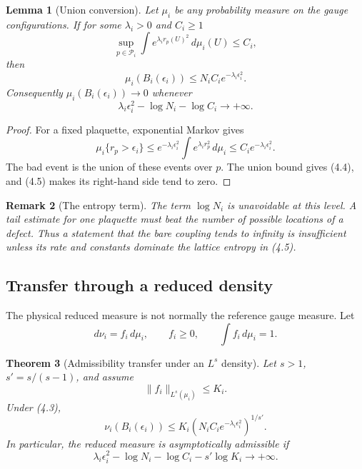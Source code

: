 \documentclass[11pt]{article}
\newtheorem{theorem}{Theorem}[section]
\newtheorem{lemma}[theorem]{Lemma}
\newtheorem{remark}[theorem]{Remark}
\begin{document}
\begin{lemma}[Union conversion]
\label{lem:v11v4-union}
Let \(\mu_i\) be any probability measure on the gauge configurations.
If for some \(\lambda_i>0\) and \(C_i\geq1\)
\[
 \sup_{p\in\mathcal P_i}
 \int e^{\lambda_i r_p(U)^2}\,d\mu_i(U)
 \leq C_i,
 \tag{4.3}
\]
then
\[
 \mu_i(B_i(\epsilon_i))
 \leq
 N_iC_i e^{-\lambda_i\epsilon_i^2}.
 \tag{4.4}
\]
Consequently \(\mu_i(B_i(\epsilon_i))\to0\) whenever
\[
 \lambda_i\epsilon_i^2-\log N_i-\log C_i
 \longrightarrow+\infty.
 \tag{4.5}
\]
\end{lemma}

\begin{proof}
For a fixed plaquette, exponential Markov gives
\[
 \mu_i\{r_p>\epsilon_i\}
 \leq
 e^{-\lambda_i\epsilon_i^2}
 \int e^{\lambda_i r_p^2}\,d\mu_i
 \leq C_ie^{-\lambda_i\epsilon_i^2}.
\]
The bad event is the union of these events over \(p\).  The union bound
gives (4.4), and (4.5) makes its right-hand side tend to zero.
\end{proof}

\begin{remark}[The entropy term]
\label{rem:v11v4-entropy}
The term \(\log N_i\) is unavoidable at this level.  A tail estimate for
one plaquette must beat the number of possible locations of a defect.
Thus a statement that the bare coupling tends to infinity is insufficient
unless its rate and constants dominate the lattice entropy in (4.5).
\end{remark}

\subsection{Transfer through a reduced density}

The physical reduced measure is not normally the reference gauge measure.
Let
\[
 d\nu_i=f_i\,d\mu_i,\qquad f_i\geq0,\qquad
 \int f_i\,d\mu_i=1.
 \tag{4.6}
\]

\begin{theorem}[Admissibility transfer under an \(L^s\) density]
\label{thm:v11v4-density-transfer}
Let \(s>1\), \(s'=s/(s-1)\), and assume
\[
 \|f_i\|_{L^s(\mu_i)}\leq K_i.
 \tag{4.7}
\]
Under (4.3),
\[
 \nu_i(B_i(\epsilon_i))
 \leq
 K_i
 \left(N_iC_ie^{-\lambda_i\epsilon_i^2}\right)^{1/s'}.
 \tag{4.8}
\]
In particular, the reduced measure is asymptotically admissible if
\[
 \lambda_i\epsilon_i^2-\log N_i-\log C_i
 -s'\log K_i
 \longrightarrow+\infty.
 \tag{4.9}
\]
\end{theorem}
\end{document}
